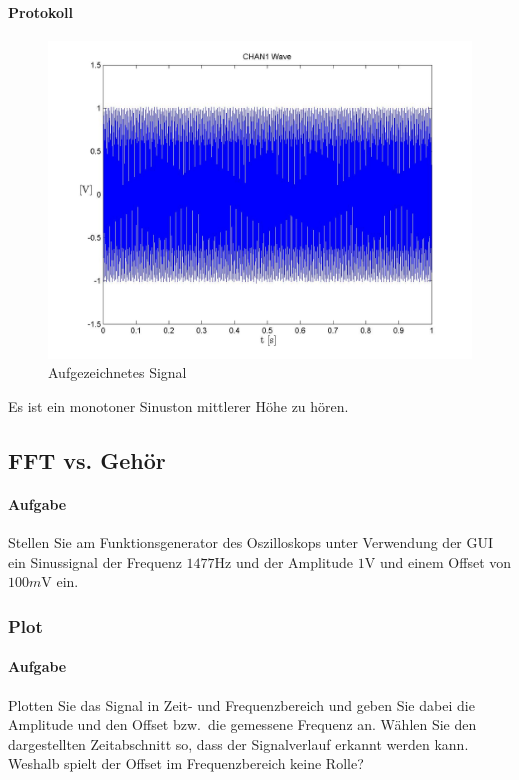 \documentclass[10pt]{scrreprt}
\begin{document}
        \paragraph{Protokoll}
        \begin{center}
            \begin{figure}[H]
                \includegraphics[width=\textwidth]{Screenshot_GUI_4112_Wave_chan1_wave.jpg}
              \caption{Aufgezeichnetes Signal}
            \end{figure}
        \end{center}

        Es ist ein monotoner Sinuston mittlerer Höhe zu hören.

        \subsection{FFT vs. Gehör}
        \paragraph{Aufgabe}
        Stellen Sie am Funktionsgenerator des Oszilloskops unter Verwendung der GUI ein Sinussignal
        der Frequenz $1477\si{\hertz}$ und der Amplitude $1\si{\volt}$ und einem Offset von $100\si{m\volt}$
        ein.

        \subsubsection{Plot}
        \paragraph{Aufgabe}
        Plotten Sie das Signal in Zeit- und Frequenzbereich und geben Sie dabei die Amplitude
        und den Offset bzw.\ die gemessene Frequenz an. Wählen Sie den dargestellten
        Zeitabschnitt so, dass der Signalverlauf erkannt werden kann. Weshalb spielt der
        Offset im Frequenzbereich keine Rolle?
\end{document}
